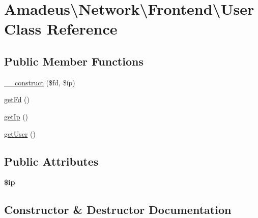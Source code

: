 \hypertarget{classAmadeus_1_1Network_1_1Frontend_1_1User}{}\section{Amadeus\textbackslash{}Network\textbackslash{}Frontend\textbackslash{}User Class Reference}
\label{classAmadeus_1_1Network_1_1Frontend_1_1User}
\subsection*{Public Member Functions}
\begin{DoxyCompactItemize}
\item 
\hyperlink{classAmadeus_1_1Network_1_1Frontend_1_1User_a277aa2ef20b32325b54bb54b6aae630f}{\+\_\+\+\_\+construct} (\$fd, \$ip)
\item 
\hyperlink{classAmadeus_1_1Network_1_1Frontend_1_1User_a8a2156e438591d9cda43c718693a8fd9}{get\+Fd} ()
\item 
\hyperlink{classAmadeus_1_1Network_1_1Frontend_1_1User_aa45e2f00aa4f658de8a735997adf6678}{get\+Ip} ()
\item 
\hyperlink{classAmadeus_1_1Network_1_1Frontend_1_1User_acb0c975efed8a7c9cdd517fc2754c7f5}{get\+User} ()
\end{DoxyCompactItemize}
\subsection*{Public Attributes}
\begin{DoxyCompactItemize}
\item 
\mbox{\label{classAmadeus_1_1Network_1_1Frontend_1_1User_a12ce69b379c38eb62b2377932dc16e2d}} 
{\bfseries \$ip}
\end{DoxyCompactItemize}


\subsection{Constructor \& Destructor Documentation}
\mbox{\label{classAmadeus_1_1Network_1_1Frontend_1_1User_a277aa2ef20b32325b54bb54b6aae630f}} 
